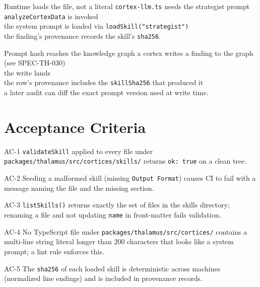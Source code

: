 \begin{scenario}{Runtime loads the file, not a literal}
\Given \texttt{cortex-llm.ts} needs the strategist prompt \\
\When \texttt{analyzeCortexData} is invoked \\
\Then the system prompt is loaded via \texttt{loadSkill("strategist")} \\
\And the finding's provenance records the skill's \texttt{sha256}.
\end{scenario}

\begin{scenario}{Prompt hash reaches the knowledge graph}
\Given a cortex writes a finding to the graph (see SPEC-TH-030) \\
\When the write lands \\
\Then the row's provenance includes the \texttt{skillSha256} that produced it \\
\And a later audit can diff the exact prompt version used at write time.
\end{scenario}

\section{Acceptance Criteria}

\begin{ac}{AC-1}
\texttt{validateSkill} applied to every file under
\texttt{packages/thalamus/src/cortices/skills/} returns \texttt{ok: true} on a clean tree.
\end{ac}

\begin{ac}{AC-2}
Seeding a malformed skill (missing \texttt{Output Format}) causes CI to fail with a message
naming the file and the missing section.
\end{ac}

\begin{ac}{AC-3}
\texttt{listSkills()} returns exactly the set of files in the skills directory; renaming
a file and not updating \texttt{name} in front-matter fails validation.
\end{ac}

\begin{ac}{AC-4}
No TypeScript file under \texttt{packages/thalamus/src/cortices/} contains a multi-line
string literal longer than 200 characters that looks like a system prompt; a lint rule
enforces this.
\end{ac}

\begin{ac}{AC-5}
The \texttt{sha256} of each loaded skill is deterministic across machines (normalized line
endings) and is included in provenance records.
\end{ac}

